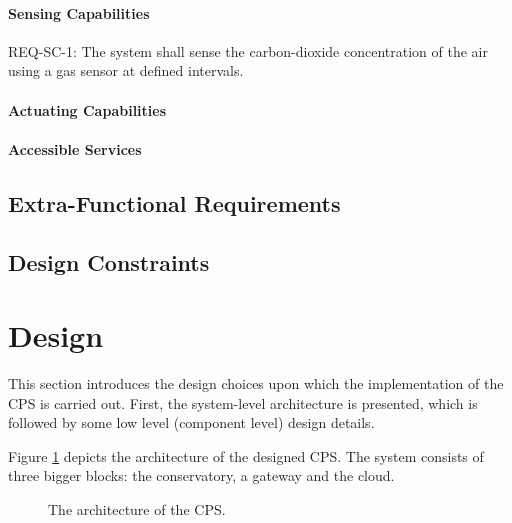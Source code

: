 \documentclass[a4paper, 11pt]{article}
\begin{document}
	\paragraph{Sensing Capabilities}
	REQ-SC-1: The system shall sense the carbon-dioxide concentration of the air using a gas sensor at defined intervals.
	\paragraph{Actuating Capabilities}
	
	\paragraph{Accessible Services}
	
	\subsection{Extra-Functional Requirements}
	
	\subsection{Design Constraints}
	
	\section{Design}
	\label{sec:design}
	This section introduces the design	choices upon which the implementation of the CPS is carried out. First, the system-level architecture is presented, which is followed by some low level (component level) design details.
	
	Figure \ref{fig:architecture} depicts the architecture of the designed CPS. The system consists of three bigger blocks: the conservatory, a gateway and the cloud. 
		
		\begin{figure}[h!]
			\center
			\caption{The architecture of the CPS.}
			\label{fig:architecture}
		\end{figure}
\end{document}
